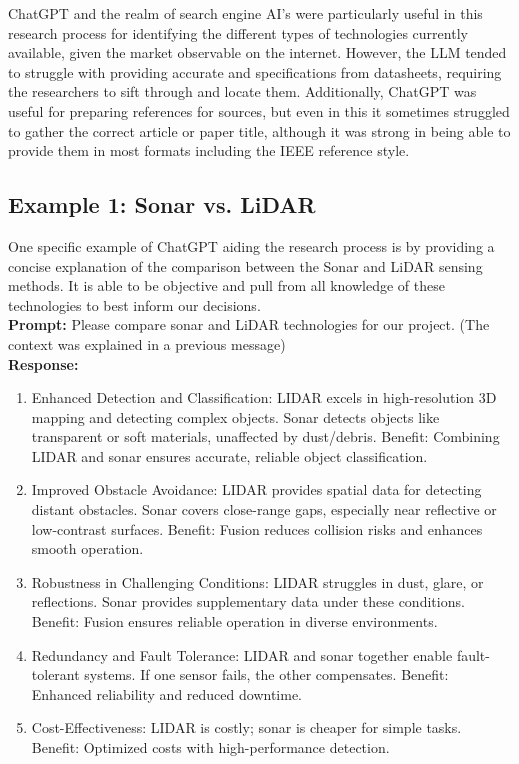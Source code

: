 \noindent ChatGPT and the realm of search engine AI's were particularly useful in this research process for identifying the different types of technologies currently available, given the market observable on the internet. However, the LLM tended to struggle with providing accurate and specifications from datasheets, requiring the researchers to sift through and locate them. Additionally, ChatGPT was useful for preparing references for sources, but even in this it sometimes struggled to gather the correct article or paper title, although it was strong in being able to provide them in most formats including the IEEE reference style.\\

\subsection{Example 1: Sonar vs. LiDAR}
\noindent One specific example of ChatGPT aiding the research process is by providing a concise explanation of the comparison between the Sonar and LiDAR sensing methods. It is able to be objective and pull from all knowledge of these technologies to best inform our decisions.\\

\noindent \textbf{Prompt:} Please compare sonar and LiDAR technologies for our project. (The context was explained in a previous message)\\

\noindent \textbf{Response:}
\begin{enumerate}
	\item Enhanced Detection and Classification:
	LIDAR excels in high-resolution 3D mapping and detecting complex objects.
	Sonar detects objects like transparent or soft materials, unaffected by dust/debris.
	Benefit: Combining LIDAR and sonar ensures accurate, reliable object classification.
	\item Improved Obstacle Avoidance:
	LIDAR provides spatial data for detecting distant obstacles.
	Sonar covers close-range gaps, especially near reflective or low-contrast surfaces.
	Benefit: Fusion reduces collision risks and enhances smooth operation.
	\item Robustness in Challenging Conditions:
	LIDAR struggles in dust, glare, or reflections.
	Sonar provides supplementary data under these conditions.
	Benefit: Fusion ensures reliable operation in diverse environments.
	\item Redundancy and Fault Tolerance:
	LIDAR and sonar together enable fault-tolerant systems.
	If one sensor fails, the other compensates.
	Benefit: Enhanced reliability and reduced downtime.
	\item Cost-Effectiveness:
	LIDAR is costly; sonar is cheaper for simple tasks.
	Benefit: Optimized costs with high-performance detection.
\end{enumerate}


